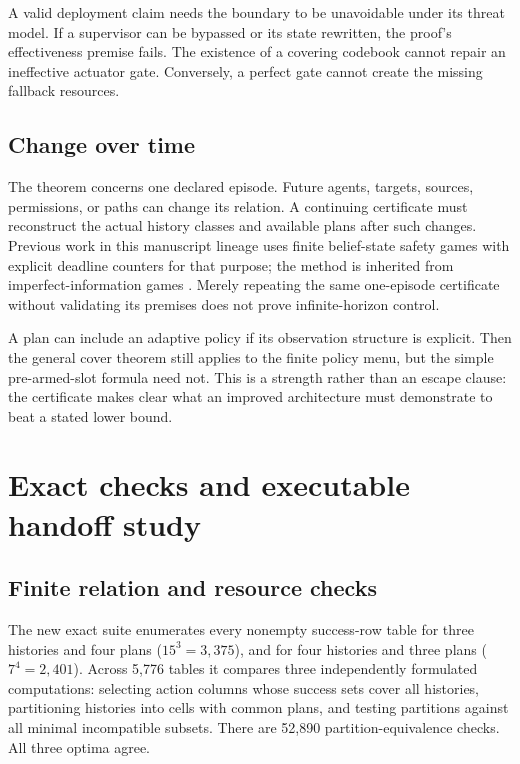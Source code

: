 \documentclass[11pt,a4paper]{article}
\theoremstyle{definition}\newtheorem{definition}{Definition}
\begin{document}
A valid deployment claim needs the boundary to be unavoidable under its threat model. If a supervisor can be bypassed or its state rewritten, the proof's effectiveness premise fails. The existence of a covering codebook cannot repair an ineffective actuator gate. Conversely, a perfect gate cannot create the missing fallback resources.

\subsection{Change over time}
The theorem concerns one declared episode. Future agents, targets, sources, permissions, or paths can change its relation. A continuing certificate must reconstruct the actual history classes and available plans after such changes. Previous work in this manuscript lineage uses finite belief-state safety games with explicit deadline counters for that purpose; the method is inherited from imperfect-information games \cite{chatterjee}. Merely repeating the same one-episode certificate without validating its premises does not prove infinite-horizon control.

A plan can include an adaptive policy if its observation structure is explicit. Then the general cover theorem still applies to the finite policy menu, but the simple pre-armed-slot formula need not. This is a strength rather than an escape clause: the certificate makes clear what an improved architecture must demonstrate to beat a stated lower bound.

\section{Exact checks and executable handoff study}
\label{sec:evidence}
\subsection{Finite relation and resource checks}
The new exact suite enumerates every nonempty success-row table for three histories and four plans ($15^3=3,375$), and for four histories and three plans ($7^4=2,401$). Across 5,776 tables it compares three independently formulated computations: selecting action columns whose success sets cover all histories, partitioning histories into cells with common plans, and testing partitions against all minimal incompatible subsets. There are 52,890 partition-equivalence checks. All three optima agree.
\end{document}
